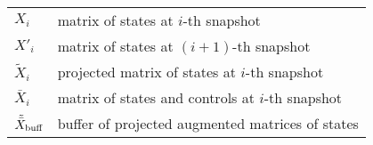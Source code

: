\begin{longtable}{p{2cm}l}
	\(X_i\)                        & matrix of states at \(i\)-th snapshot                   \\
	\(X'_i\)                       & matrix of states at \((i+1)\)-th snapshot               \\
	\(\tilde{X}_i\)                & projected matrix of states at \(i\)-th snapshot         \\
	\(\bar{X}_i\)                  & matrix of states and controls at \(i\)-th snapshot      \\
	\(\tilde{\bar{X}} _{\text{buff}}\) & buffer of projected augmented matrices of states        \\
	\bottomrule
\end{longtable}
